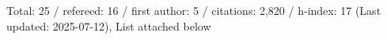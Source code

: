 Total: 25 / refereed: 16 / first author: 5 / citations: 2,820 / h-index: 17 (Last updated: 2025-07-12), List attached below